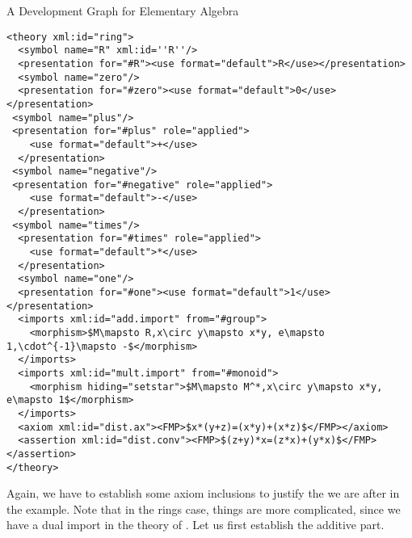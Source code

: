 \begin{tchapter}[id=dg-elal]{A Development Graph for Elementary Algebra}
\begin{lstlisting}[mathescape,index={theory,imports}]
<theory xml:id="ring"> 
  <symbol name="R" xml:id=''R''/>
  <presentation for="#R"><use format="default">R</use></presentation>
  <symbol name="zero"/>
  <presentation for="#zero"><use format="default">0</use></presentation>
 <symbol name="plus"/>
 <presentation for="#plus" role="applied">
    <use format="default">+</use>
  </presentation>
 <symbol name="negative"/>
 <presentation for="#negative" role="applied">
    <use format="default">-</use>
  </presentation>
 <symbol name="times"/>
  <presentation for="#times" role="applied">
    <use format="default">*</use>
  </presentation>
  <symbol name="one"/> 
  <presentation for="#one"><use format="default">1</use></presentation>
  <imports xml:id="add.import" from="#group"> 
    <morphism>$M\mapsto R,x\circ y\mapsto x*y, e\mapsto 1,\cdot^{-1}\mapsto -$</morphism> 
  </imports> 
  <imports xml:id="mult.import" from="#monoid"> 
    <morphism hiding="setstar">$M\mapsto M^*,x\circ y\mapsto x*y, e\mapsto 1$</morphism> 
  </imports> 
  <axiom xml:id="dist.ax"><FMP>$x*(y+z)=(x*y)+(x*z)$</FMP></axiom> 
  <assertion xml:id="dist.conv"><FMP>$(z+y)*x=(z*x)+(y*x)$</FMP></assertion>
</theory>
\end{lstlisting}

Again, we have to establish some axiom inclusions to justify the
{} we are after in the example. Note that in the
rings case, things are more complicated, since we have a dual import in the theory
of {}. Let us first establish the additive part. 
 

\end{tchapter}
